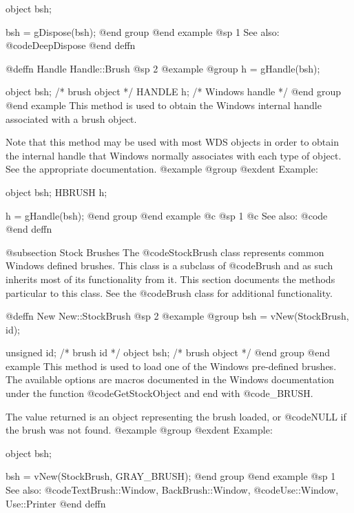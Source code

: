 object  bsh;

bsh = gDispose(bsh);
@end group
@end example
@sp 1
See also:  @code{DeepDispose}
@end deffn






@deffn {Handle} Handle::Brush
@sp 2
@example
@group
h = gHandle(bsh);

object  bsh;    /*  brush object    */
HANDLE  h;      /*  Windows handle  */
@end group
@end example
This method is used to obtain the Windows internal handle associated with
a brush object.  

Note that this method may be used with most WDS objects in order to obtain
the internal handle that Windows normally associates with each type of object.
See the appropriate documentation.
@example
@group
@exdent Example:

object  bsh;
HBRUSH  h;

h = gHandle(bsh);
@end group
@end example
@c @sp 1
@c See also:  @code{}
@end deffn








@subsection Stock Brushes
The @code{StockBrush} class represents common Windows defined brushes.  This
class is a subclass of @code{Brush} and as such inherits most of its
functionality from it.  This section documents the methods particular to
this class.  See the @code{Brush} class for additional functionality.






@deffn {New} New::StockBrush
@sp 2
@example
@group
bsh = vNew(StockBrush, id);

unsigned id;    /*  brush id      */
object  bsh;    /*  brush object  */
@end group
@end example
This method is used to load one of the Windows pre-defined brushes.
The available options are macros documented in the Windows documentation
under the function @code{GetStockObject} and end with @code{_BRUSH}.

The value returned is an object representing the brush loaded, or
@code{NULL} if the brush was not found.
@example
@group
@exdent Example:

object  bsh;

bsh = vNew(StockBrush, GRAY_BRUSH);
@end group
@end example
@sp 1
See also:  @code{TextBrush::Window, BackBrush::Window,}
        @code{Use::Window, Use::Printer}
@end deffn









